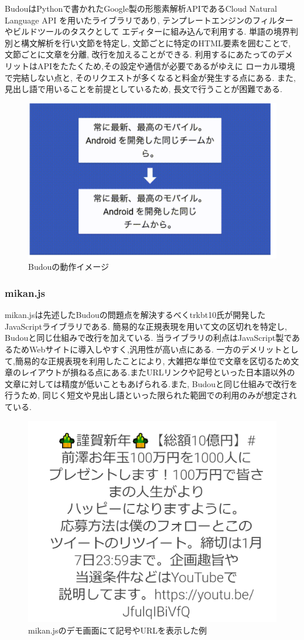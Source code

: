 BudouはPythonで書かれたGoogle製の形態素解析APIであるCloud Natural Language API
を用いたライブラリであり, テンプレートエンジンのフィルターやビルドツールのタスクとして
エディターに組み込んで利用する.
単語の境界判別と構文解析を行い文節を特定し, 文節ごとに特定のHTML要素を囲むことで, 
文節ごとに文章を分離, 改行を加えることができる.
利用するにあたってのデメリットはAPIをたたくため,その設定や通信が必要であるがゆえに
ローカル環境で完結しない点と, そのリクエストが多くなると料金が発生する点にある.
また, 見出し語で用いることを前提としているため, 長文で行うことが困難である.

\begin{figure}[H]
    \centering
    \label{fig:image7}
    \includegraphics[width=0.6\columnwidth]{image/02/img2.png}
    \caption[Budouの動作イメージ] {Budouの動作イメージ\footnotemark[3]}
\end{figure}

\subsubsection{mikan.js}

mikan.jsは先述したBudouの問題点を解決するべくtrkbt10氏が開発したJavaScriptライブラリである.
簡易的な正規表現を用いて文の区切れを特定し, Budouと同じ仕組みで改行を加えている.
当ライブラリの利点はJavaScript製であるためWebサイトに導入しやすく,汎用性が高い点にある.
一方のデメリットとして,簡易的な正規表現を利用したことにより, 
大雑把な単位で文章を区切るため文章のレイアウトが損ねる点にある.またURLリンクや記号といった日本語以外の
文章に対しては精度が低いこともあげられる.また, Budouと同じ仕組みで改行を行うため, 
同じく短文や見出し語といった限られた範囲での利用のみが想定されている.

\begin{figure}[H]
    \centering
    \label{fig:image8}
    \includegraphics[width=0.6\columnwidth]{image/02/img3.png}
    \caption[mikan.jsのデモ画面にて記号やURLを表示した例]{mikan.jsのデモ画面にて記号やURLを表示した例\footnotemark[4]}
\end{figure}

